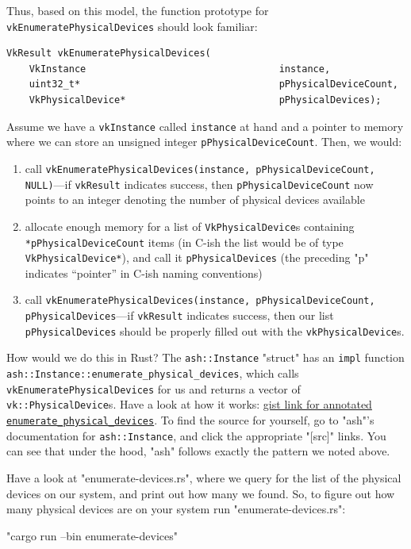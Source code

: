 \documentclass[12pt,letterpaper]{article}
\newcommand{\inquotes}[1]{``#1''}	%
\newcommand{\ril}[1]{\texttt{#1}}
\newcommand{\cil}[1]{\texttt{#1}}
\begin{document}
	Thus, based on this model, the function prototype for \cil{vkEnumeratePhysicalDevices} should look familiar:
	\begin{verbatim}
VkResult vkEnumeratePhysicalDevices(
	VkInstance                                  instance,
	uint32_t*                                   pPhysicalDeviceCount,
	VkPhysicalDevice*                           pPhysicalDevices);
	\end{verbatim}
	Assume we have a \cil{vkInstance} called \cil{instance} at hand and a pointer to memory where we can store an unsigned integer \cil{pPhysicalDeviceCount}. Then, we would:
		\begin{enumerate}
			\item call \cil{vkEnumeratePhysicalDevices(instance, pPhysicalDeviceCount, NULL)}---if \cil{vkResult} indicates success, then \cil{pPhysicalDeviceCount} now points to an integer denoting the number of physical devices available
			
			\item allocate enough memory for a list of \cil{VkPhysicalDevice}s containing \cil{*pPhysicalDeviceCount} items (in C-ish the list would be of type \cil{VkPhysicalDevice*}), and call it \cil{pPhysicalDevices} (the preceding "p" indicates \inquotes{pointer} in C-ish naming conventions)
			
			\item call \cil{vkEnumeratePhysicalDevices(instance, pPhysicalDeviceCount, pPhysicalDevices}---if \cil{vkResult} indicates success, then our list \cil{pPhysicalDevices} should be properly filled out with the \cil{vkPhysicalDevice}s.
		\end{enumerate}
	
	How would we do this in Rust? The \ril{ash::Instance} "struct" has an \ril{impl} function \ril{ash::Instance::enumerate_physical_devices}, which calls \cil{vkEnumeratePhysicalDevices} for us and returns a vector of \ril{vk::PhysicalDevice}s. Have a look at how it works: \href{https://gist.github.com/bzm3r/175cd2b63db8f783ed968df20462be67}{gist link for annotated \ril{enumerate_physical_devices}}. To find the source for yourself, go to "ash"'s documentation for \ril{ash::Instance}, and click the appropriate "[src]" links. You can see that under the hood, "ash" follows exactly the pattern we noted above. 
	
	Have a look at "enumerate-devices.rs", where we query for the list of the physical devices on our system, and print out how many we found. So, to figure out how many physical devices are on your system run "enumerate-devices.rs": 
		\begin{center}
			"cargo run --bin enumerate-devices"
		\end{center}
	
\end{document}
